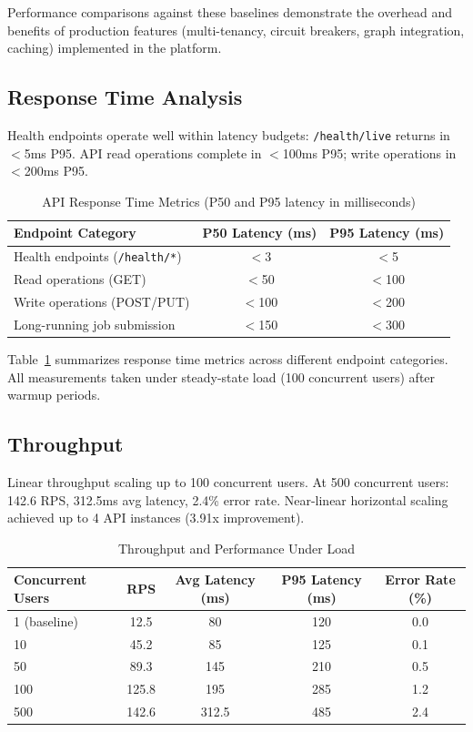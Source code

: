\documentclass[a4paper,twoside]{sapthesis}
\begin{document}
Performance comparisons against these baselines demonstrate the overhead and benefits of production features (multi-tenancy, circuit breakers, graph integration, caching) implemented in the platform.

\subsection{Response Time Analysis}

Health endpoints operate well within latency budgets: \texttt{/health/live} returns in $<$5ms P95. API read operations complete in $<$100ms P95; write operations in $<$200ms P95.

\begin{table}[ht]
\centering
\caption{API Response Time Metrics (P50 and P95 latency in milliseconds)}
\label{tab:performance-latency}
\small
\begin{tabular}{lcc}
    \hline
    Endpoint Category & P50 Latency (ms) & P95 Latency (ms) \\
    \hline
    Health endpoints (\texttt{/health/*}) & $<$3 & $<$5 \\
    Read operations (GET) & $<$50 & $<$100 \\
    Write operations (POST/PUT) & $<$100 & $<$200 \\
    Long-running job submission & $<$150 & $<$300 \\
    \hline
\end{tabular}
\end{table}

Table~\ref{tab:performance-latency} summarizes response time metrics across different endpoint categories. All measurements taken under steady-state load (100 concurrent users) after warmup periods.

\subsection{Throughput}

Linear throughput scaling up to 100 concurrent users. At 500 concurrent users: 142.6 RPS, 312.5ms avg latency, 2.4\% error rate. Near-linear horizontal scaling achieved up to 4 API instances (3.91x improvement).

\begin{table}[ht]
\centering
\caption{Throughput and Performance Under Load}
\label{tab:performance-throughput}
\small
\begin{tabular}{lcccc}
    \hline
    Concurrent Users & RPS & Avg Latency (ms) & P95 Latency (ms) & Error Rate (\%) \\
    \hline
    1 (baseline) & 12.5 & 80 & 120 & 0.0 \\
    10 & 45.2 & 85 & 125 & 0.1 \\
    50 & 89.3 & 145 & 210 & 0.5 \\
    100 & 125.8 & 195 & 285 & 1.2 \\
    500 & 142.6 & 312.5 & 485 & 2.4 \\
    \hline
\end{tabular}
\end{table}
\end{document}
